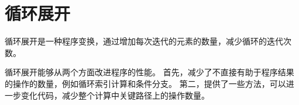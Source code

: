 
\section{循环展开}
{
    循环展开是一种程序变换，通过增加每次迭代的元素的数量，减少循环的迭代次数。

    循环展开能够从两个方面改进程序的性能。
    首先，减少了不直接有助于程序结果的操作的数量，例如循环索引计算和条件分支。
    第二，提供了一些方法，可以进一步变化代码，减少整个计算中关键路径上的操作数量。

    \begin{practicec}

    \end{practicec}
}
